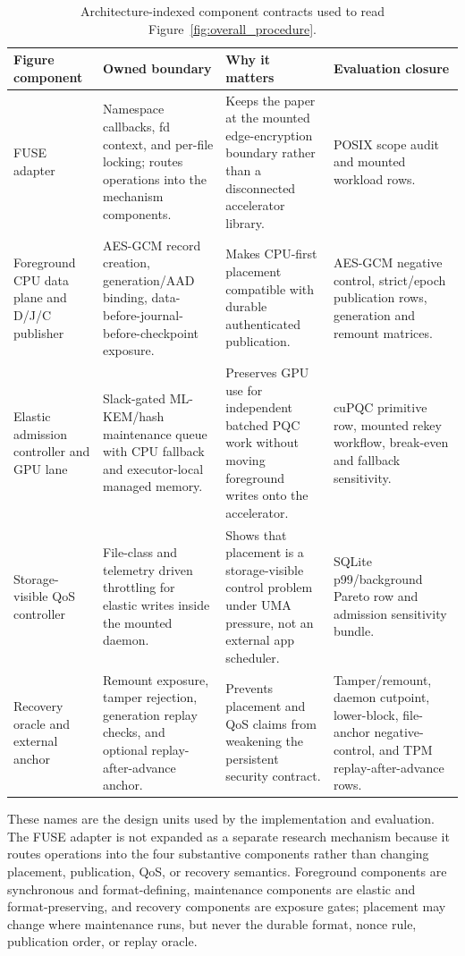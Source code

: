 \begin{table}[t]
\centering
\caption{Architecture-indexed component contracts used to read Figure~\ref{fig:overall_procedure}.}
\tiny
\setlength{\tabcolsep}{3pt}
\begin{tabularx}{\textwidth}{P{0.20\textwidth}|P{0.26\textwidth}|P{0.27\textwidth}|Y}
\toprule
\textbf{Figure component} & \textbf{Owned boundary} & \textbf{Why it matters} & \textbf{Evaluation closure}\\
\midrule
FUSE adapter & Namespace callbacks, fd context, and per-file locking; routes operations into the mechanism components. & Keeps the paper at the mounted edge-encryption boundary rather than a disconnected accelerator library. & POSIX scope audit and mounted workload rows.\\
Foreground CPU data plane and D/J/C publisher & AES-GCM record creation, generation/AAD binding, data-before-journal-before-checkpoint exposure. & Makes CPU-first placement compatible with durable authenticated publication. & AES-GCM negative control, strict/epoch publication rows, generation and remount matrices.\\
Elastic admission controller and GPU lane & Slack-gated ML-KEM/hash maintenance queue with CPU fallback and executor-local managed memory. & Preserves GPU use for independent batched PQC work without moving foreground writes onto the accelerator. & cuPQC primitive row, mounted rekey workflow, break-even and fallback sensitivity.\\
Storage-visible QoS controller & File-class and telemetry driven throttling for elastic writes inside the mounted daemon. & Shows that placement is a storage-visible control problem under UMA pressure, not an external app scheduler. & SQLite p99/background Pareto row and admission sensitivity bundle.\\
Recovery oracle and external anchor & Remount exposure, tamper rejection, generation replay checks, and optional replay-after-advance anchor. & Prevents placement and QoS claims from weakening the persistent security contract. & Tamper/remount, daemon cutpoint, lower-block, file-anchor negative-control, and TPM replay-after-advance rows.\\
\bottomrule
\end{tabularx}
\label{tab:component_contracts}
\end{table}

These names are the design units used by the implementation and evaluation.  The FUSE adapter is not expanded as a separate research mechanism because it routes operations into the four substantive components rather than changing placement, publication, QoS, or recovery semantics.  Foreground components are synchronous and format-defining, maintenance components are elastic and format-preserving, and recovery components are exposure gates; placement may change where maintenance runs, but never the durable format, nonce rule, publication order, or replay oracle.

